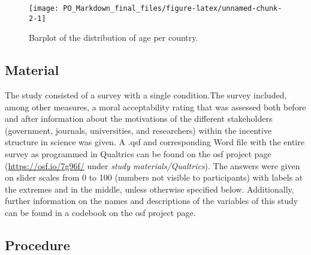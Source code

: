 \documentclass[
  man,floatsintext]{apa7}
\begin{document}
\begin{figure}
\texttt{[image: PO\_Markdown\_final\_files/figure-latex/unnamed-chunk-2-1]} \caption{Barplot of the distribution of age per country.\label{fig:barplot_age}}\label{fig:unnamed-chunk-2}
\end{figure}

\hypertarget{material}{%
\subsection{Material}\label{material}}

The study consisted of a survey with a single condition.The survey included,
among other measures, a moral acceptability rating that was assessed both
before and after information about the motivations of the different stakeholders (government,
journals, universities, and researchers) within the incentive structure
in science was given. A .qsf and corresponding Word file with the entire
survey as programmed in Qualtrics can be found on the osf project page
(\url{https://osf.io/7g96f/} under \emph{study materials/Qualtrics}). The answers
were given on slider scales from 0 to 100 (numbers not visible to
participants) with labels at the extremes and in the middle, unless
otherwise specified below. Additionally, further information on the names and descriptions of the variables of this study can be found in a codebook on the osf project page.

\hypertarget{procedure}{%
\subsection{Procedure}\label{procedure}}
\end{document}
